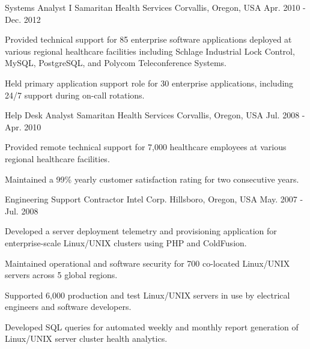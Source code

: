\begin{cventries}
  \cventry
    {Systems Analyst I} %
    {Samaritan Health Services} %
    {Corvallis, Oregon, USA} %
    {Apr. 2010 - Dec. 2012} %
    {
      \begin{cvitems} %
        \item {Provided technical support for 85 enterprise software applications deployed at various regional healthcare facilities including Schlage Industrial Lock Control, MySQL, PostgreSQL, and Polycom Teleconference Systems.}
        \item {Held primary application support role for 30 enterprise applications, including 24/7 support during on-call rotations.}
      \end{cvitems}
    }
    
  \cventry
    {Help Desk Analyst} %
    {Samaritan Health Services} %
    {Corvallis, Oregon, USA} %
    {Jul. 2008 - Apr. 2010} %
    {
      \begin{cvitems} %
        \item {Provided remote technical support for 7,000 healthcare employees at various regional healthcare facilities.}
        \item {Maintained a 99\% yearly customer satisfaction rating for two consecutive years.}
      \end{cvitems}
    }
    
  \cventry
    {Engineering Support Contractor} %
    {Intel Corp.} %
    {Hillsboro, Oregon, USA} %
    {May. 2007 - Jul. 2008} %
    {
   	  \begin{cvitems} %
        \item {Developed a server deployment telemetry and provisioning application for enterprise-scale Linux/UNIX clusters using PHP and ColdFusion.}
        \item {Maintained operational and software security for 700 co-located Linux/UNIX servers across 5 global regions.}
        \item {Supported 6,000 production and test Linux/UNIX servers in use by electrical engineers and software developers.}
        \item {Developed SQL queries for automated weekly and monthly report generation of Linux/UNIX server cluster health analytics.}
      \end{cvitems}
    }

\end{cventries}
